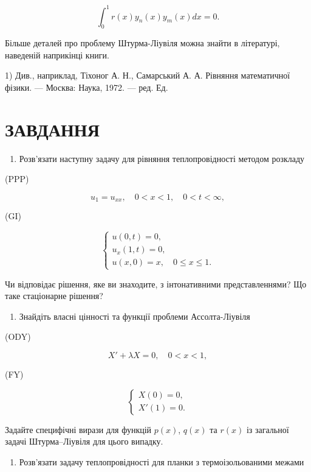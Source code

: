 \documentclass[
  ukrainian,
]{article}
\providecommand{\tightlist}{%
  \setlength{\itemsep}{0pt}\setlength{\parskip}{0pt}}
\begin{document}
\[
\int_{0}^{1} r(x) y_{n}(x) y_{m}(x) dx = 0.
\]

Більше деталей про проблему Штурма-Ліувіля можна знайти в літературі,
наведеній наприкінці книги.

1) Див., наприклад, Тіхоног А. Н., Самарський А. А. Рівняння
математичної фізики. --- Москва: Наука, 1972. --- ред. Ед.

\section{ЗАВДАННЯ}\label{ux437ux430ux432ux434ux430ux43dux43dux44f-5}

\begin{enumerate}
\def\labelenumi{\arabic{enumi}.}
\tightlist
\item
  Розв'язати наступну задачу для рівняння теплопровідності методом
  розкладу
\end{enumerate}

(PPP)

\[
u_1 = u_{xx}, \quad 0 < x < 1, \quad 0 < t < \infty,
\]

(GI)

\[
\begin{cases} u(0, t) = 0, \\ u_x(1, t) = 0, \\ u(x, 0) = x, \quad 0 \le x \le 1. \end{cases}
\]

Чи відповідає рішення, яке ви знаходите, з інтонативними
представленнями? Що таке стаціонарне рішення?

\begin{enumerate}
\def\labelenumi{\arabic{enumi}.}
\setcounter{enumi}{1}
\tightlist
\item
  Знайдіть власні цінності та функції проблеми Ассолта-Ліувіля
\end{enumerate}

(ODY)

\[
X' + \lambda X = 0, \quad 0 < x < 1,
\]

(FY)

\[
\begin{cases} X(0) = 0, \\ X'(1) = 0. \end{cases}
\]

Задайте специфічні вирази для функцій \(p(x)\), \(q(x)\) та \(r(x)\) із
загальної задачі Штурма--Ліувіля для цього випадку.

\begin{enumerate}
\def\labelenumi{\arabic{enumi}.}
\setcounter{enumi}{2}
\tightlist
\item
  Розв'язати задачу теплопровідності для планки з термоізольованими
  межами
\end{enumerate}
\end{document}
